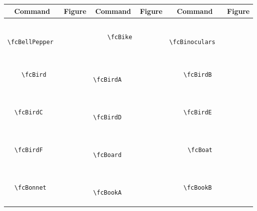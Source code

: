\documentclass[x11names]{article}
\begin{document}
\begin{table}[H]\centering\begin{tabular}{|c|c|c|c|c|c|}\hline{\bf Command} & {\bf Figure} & {\bf Command} & {\bf Figure} & {\bf Command} & {\bf Figure}\\	\hline	&\multirow{5}{*}{	\fcBellPepper	[scale=0.16]} & &\multirow{5}{*}{	\fcBike	[scale=0.64]} & &\multirow{5}{*}{	\fcBinoculars	[scale=0.16]}\\	& & & & & \\	& & & & & \\	\verb|	\fcBellPepper	| & & \verb|	\fcBike	| & & \verb|	\fcBinoculars	| & \\	& & & & & \\	& & & & & \\	& & & & & \\	\hline									
		&\multirow{5}{*}{	\fcBird	[scale=0.64]} & &\multirow{5}{*}{	\fcBirdA	[scale=0.64]} & &\multirow{5}{*}{	\fcBirdB	[scale=0.64]}\\	& & & & & \\	& & & & & \\	\verb|	\fcBird	| & & \verb|	\fcBirdA	| & & \verb|	\fcBirdB	| & \\	& & & & & \\	& & & & & \\	& & & & & \\	\hline									
		&\multirow{5}{*}{	\fcBirdC	[scale=0.64]} & &\multirow{5}{*}{	\fcBirdD	[scale=0.16]} & &\multirow{5}{*}{	\fcBirdE	[scale=0.16]}\\	& & & & & \\	& & & & & \\	\verb|	\fcBirdC	| & & \verb|	\fcBirdD	| & & \verb|	\fcBirdE	| & \\	& & & & & \\	& & & & & \\	& & & & & \\	\hline									
		&\multirow{5}{*}{	\fcBirdF	[scale=0.64]} & &\multirow{5}{*}{	\fcBoard	[scale=0.16]} & &\multirow{5}{*}{	\fcBoat	[scale=0.64]}\\	& & & & & \\	& & & & & \\	\verb|	\fcBirdF	| & & \verb|	\fcBoard	| & & \verb|	\fcBoat	| & \\	& & & & & \\	& & & & & \\	& & & & & \\	\hline									
		&\multirow{5}{*}{	\fcBonnet	[scale=0.64]} & &\multirow{5}{*}{	\fcBookA	[scale=0.64]} & &\multirow{5}{*}{	\fcBookB	[scale=0.64]}\\	& & & & & \\	& & & & & \\	\verb|	\fcBonnet	| & & \verb|	\fcBookA	| & & \verb|	\fcBookB	| & \\	& & & & & \\	& & & & & \\	& & & & & \\	\hline									

\end{tabular}
\end{table}
\end{document}
